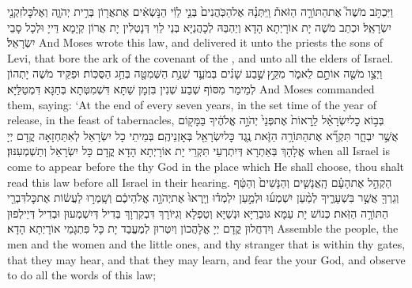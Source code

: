 {וַיִּכְתֹּ֣ב מֹשֶׁה֮ אֶת\maqqaf הַתּוֹרָ֣ה הַזֹּאת֒ וַֽיִּתְּנָ֗הּ אֶל\maqqaf הַכֹּֽהֲנִים֙ בְּנֵ֣י לֵוִ֔י הַנֹּ֣שְׂאִ֔ים אֶת\maqqaf אֲר֖וֹן בְּרִ֣ית יְהֹוָ֑ה וְאֶל\maqqaf כׇּל\maqqaf זִקְנֵ֖י יִשְׂרָאֵֽל׃}
{וּכְתַב מֹשֶׁה יָת אוֹרָיְתָא הָדָא וְיַהְבַּהּ לְכָהֲנַיָּא בְּנֵי לֵוִי דְּנָטְלִין יָת אֲרוֹן קְיָמָא דַּייָ וּלְכָל סָבֵי יִשְׂרָאֵל׃}
{And Moses wrote this law, and delivered it unto the priests the sons of Levi, that bore the ark of the covenant of the \lord, and unto all the elders of Israel.}{}
{וַיְצַ֥ו מֹשֶׁ֖ה אוֹתָ֣ם לֵאמֹ֑ר מִקֵּ֣ץ \legarmeh  שֶׁ֣בַע שָׁנִ֗ים בְּמֹעֵ֛ד שְׁנַ֥ת הַשְּׁמִטָּ֖ה בְּחַ֥ג הַסֻּכּֽוֹת׃}
{וּפַקֵּיד מֹשֶׁה יָתְהוֹן לְמֵימַר מִסּוֹף שְׁבַע שְׁנִין בִּזְמָן שַׁתָּא דִּשְׁמִטְּתָא בְּחַגָּא דִּמְטַלַּיָּא׃}
{And Moses commanded them, saying: ‘At the end of every seven years, in the set time of the year of release, in the feast of tabernacles,}{}
{בְּב֣וֹא כׇל\maqqaf יִשְׂרָאֵ֗ל לֵֽרָאוֹת֙ אֶת\maqqaf פְּנֵי֙ יְהֹוָ֣ה אֱלֹהֶ֔יךָ בַּמָּק֖וֹם אֲשֶׁ֣ר יִבְחָ֑ר תִּקְרָ֞א אֶת\maqqaf הַתּוֹרָ֥ה הַזֹּ֛את נֶ֥גֶד כׇּל\maqqaf יִשְׂרָאֵ֖ל בְּאׇזְנֵיהֶֽם׃}
{בְּמֵיתֵי כָל יִשְׂרָאֵל לְאִתַּחְזָאָה קֳדָם יְיָ אֱלָהָךְ בְּאַתְרָא דְּיִתְרְעֵי תִּקְרֵי יָת אוֹרָיְתָא הָדָא קֳדָם כָּל יִשְׂרָאֵל וְתַשְׁמְעִנּוּן׃}
{when all Israel is come to appear before the \lord\space thy God in the place which He shall choose, thou shalt read this law before all Israel in their hearing.}{}
{הַקְהֵ֣ל אֶת\maqqaf הָעָ֗ם הָֽאֲנָשִׁ֤ים וְהַנָּשִׁים֙ וְהַטַּ֔ף וְגֵרְךָ֖ אֲשֶׁ֣ר בִּשְׁעָרֶ֑יךָ לְמַ֨עַן יִשְׁמְע֜וּ וּלְמַ֣עַן יִלְמְד֗וּ וְיָֽרְאוּ֙ אֶת\maqqaf יְהֹוָ֣ה אֱלֹהֵיכֶ֔ם וְשָֽׁמְר֣וּ לַעֲשׂ֔וֹת אֶת\maqqaf כׇּל\maqqaf דִּבְרֵ֖י הַתּוֹרָ֥ה הַזֹּֽאת׃}
{כְּנוֹשׁ יָת עַמָּא גּוּבְרַיָּא וּנְשַׁיָּא וְטַפְלָא וְגִיּוֹרָךְ דִּבְקִרְוָךְ בְּדִיל דְּיִשְׁמְעוּן וּבְדִיל דְּיֵילְפוּן וְיִדְחֲלוּן קֳדָם יְיָ אֱלָהֲכוֹן וְיִטְּרוּן לְמֶעֱבַד יָת כָּל פִּתְגָמֵי אוֹרָיְתָא הָדָא׃}
{Assemble the people, the men and the women and the little ones, and thy stranger that is within thy gates, that they may hear, and that they may learn, and fear the \lord\space your God, and observe to do all the words of this law;}{}
